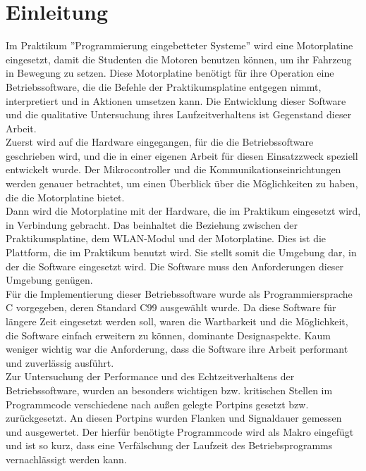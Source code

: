 \chapter{Einleitung}

Im Praktikum ''Programmierung eingebetteter Systeme'' wird eine Motorplatine \cite{STUD_TIMO}
eingesetzt, damit die Studenten die Motoren benutzen können, um ihr Fahrzeug
in Bewegung zu setzen. Diese Motorplatine benötigt für ihre Operation eine
Betriebssoftware, die die Befehle der Praktikumsplatine entgegen nimmt,
interpretiert und in Aktionen umsetzen kann. Die Entwicklung dieser Software
und die qualitative Untersuchung ihres Laufzeitverhaltens ist Gegenstand
dieser Arbeit.\\
Zuerst wird auf die Hardware eingegangen, für die die Betriebssoftware geschrieben wird,
und die in einer eigenen Arbeit für diesen Einsatzzweck speziell entwickelt wurde.
Der Mikrocontroller und die Kommunikationseinrichtungen werden genauer betrachtet, um
einen Überblick über die Möglichkeiten zu haben, die die Motorplatine bietet.\\
Dann wird die Motorplatine mit der Hardware, die im Praktikum eingesetzt wird, in Verbindung
gebracht. Das beinhaltet die Beziehung zwischen der Praktikumsplatine, dem WLAN-Modul und der
Motorplatine. Dies ist die Plattform, die im Praktikum benutzt wird. Sie stellt somit die
Umgebung dar, in der die Software eingesetzt wird. Die Software muss den Anforderungen
dieser Umgebung genügen.\\
Für die Implementierung dieser Betriebssoftware wurde als Programmiersprache
C \cite{C_PROG} vorgegeben, deren Standard C99 ausgewählt wurde. Da diese
Software für längere Zeit eingesetzt werden soll, waren die
Wartbarkeit und die Möglichkeit, die Software einfach erweitern zu können,
dominante Designaspekte. Kaum weniger wichtig war die Anforderung, dass die Software
ihre Arbeit performant und zuverlässig ausführt.\\
Zur Untersuchung der Performance und des Echtzeitverhaltens der Betriebssoftware, wurden
an besonders wichtigen bzw. kritischen Stellen im Programmcode
verschiedene nach außen gelegte Portpins gesetzt bzw. zurückgesetzt. An diesen Portpins
wurden Flanken und Signaldauer gemessen und ausgewertet. Der hierfür benötigte
Programmcode wird als Makro eingefügt und ist so kurz, dass eine Verfälschung der Laufzeit des
Betriebsprogramms vernachlässigt werden kann.
